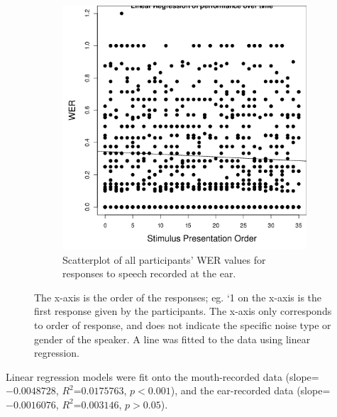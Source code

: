 \begin{figure}[ht]
\begin{subfigure}{0.47\textwidth}
\includegraphics[width=\maxwidth]{figure/line_graph_chrono-1} 

\caption{Scatterplot of all participants' WER values for responses to speech recorded at the ear.}
\label{fig:linear_performance_e}
\end{subfigure}
\caption{The x-axis is the order of the responses; eg. `1 on the x-axis is the first response given by the participants.  The x-axis only corresponds to order of response, and does not indicate the specific noise type or gender of the speaker.  A line was fitted to the data using linear regression.}
\end{figure}
%
Linear regression models were fit onto the mouth-recorded data (slope=$-0.0048728$, $R^2$=$0.0175763$, $p<0.001$), and the ear-recorded data (slope=$-0.0016076$, $R^2$=$0.003146$, $p>0.05$). 

